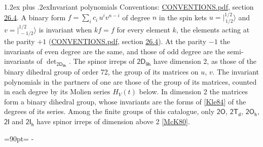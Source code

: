 \documentclass[10pt,a4paper]{article}
\makeatletter
\renewcommand\section{\@startsection{section}{1}{\z@}{-3ex plus -1ex minus -.2ex}%
  {1.2ex plus .2ex}{\normalfont\large\sffamily\bfseries\color{parttitle}}}
\newcommand{\needspace}[1]{\par\penalty-100\begingroup\dimen0=#1\relax\dimen2=\pagegoal
  \advance\dimen2-\pagetotal\ifdim\dimen0>\dimen2\relax\ifdim\dimen2>0pt\vfil\break\fi\fi
  \endgroup}
\numberwithin{equation}{section}
\newcommand{\grp}[1]{\mathsf{#1}}
\newcommand{\jm}[2]{\bigl\lvert{}^{#1}_{\,#2}\bigr\rangle}
\makeatother
\begin{document}
\section{Invariant polynomials}\label{s:invariants}
Conventions: \href{../../CONVENTIONS.pdf}{CONVENTIONS.pdf}, section \href{../../CONVENTIONS.pdf\#conv.26.4}{26.4}.
\leavevmode\label{n:local.binary.form}A binary form $f = \sum_i c_i\, u^i v^{n-i}$ of degree $n$ in the spin kets $u = \jm{1/2}{1/2}$ and $v = \jm{1/2}{-1/2}$ is invariant when $k f = f$ for every element $k$, the elements acting at the parity $+1$ (\href{../../CONVENTIONS.pdf}{CONVENTIONS.pdf}, section \href{../../CONVENTIONS.pdf\#conv.26.4}{26.4}). At the parity $-1$ the invariants of even degree are the same, and those of odd degree are the semi-invariants of $\det_{\grp{2D_{9h}}}$.
The spinor irreps of $\grp{2D_{9h}}$ have dimension 2, as those of the binary dihedral group of order 72, the group of its matrices on $u$, $v$. \label{n:function.hilbert}The invariant polynomials in the partners of one are those of the group of its matrices, counted in each degree by its Molien series $H_V(t)$ below. In dimension 2 the matrices form a binary dihedral group, whose invariants are the forms of [\href{../../../REFERENCES.pdf\#ref.Kle84}{Kle84}] of the degrees of its series. Among the finite groups of this catalogue, only $\grp{2O}$, $\grp{2T_{d}}$, $\grp{2O_{h}}$, $\grp{2I}$ and $\grp{2I_{h}}$ have spinor irreps of dimension above 2 [\href{../../../REFERENCES.pdf\#ref.McK80}{McK80}].
\needspace{90pt}
\end{document}
